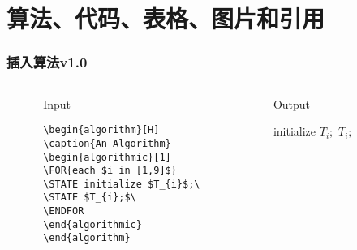 \section{算法、代码、表格、图片和引用}
\begin{frame}[fragile]\frametitle{插入算法v1.0}
  \begin{columns}
    \begin{column}{0.05\textwidth}
    \end{column}
    \begin{column}{0.45\textwidth}
    \begin{block}{Input}
    \begin{verbatim}
\begin{algorithm}[H]
\caption{An Algorithm}
\begin{algorithmic}[1]
\FOR{each $i in [1,9]$}
\STATE initialize $T_{i}$;\
\STATE $T_{i};$\
\ENDFOR
\end{algorithmic}
\end{algorithm}
    \end{verbatim}
    \end{block}
    \end{column}
    \begin{column}{0.025\textwidth}
    \end{column}
    \begin{column}{0.45\textwidth}
    \begin{block}{Output}
\begin{algorithm}[H]
\caption{An Algorithm}
\begin{algorithmic}[1]
\STATE initialize $T_{i}$;\
\STATE $T_{i};$\
\ENDFOR
\end{algorithmic}
\end{algorithm}
    \end{block}
    \end{column}
    \begin{column}{0.025\textwidth}
    \end{column}
  \end{columns}
\end{frame}

